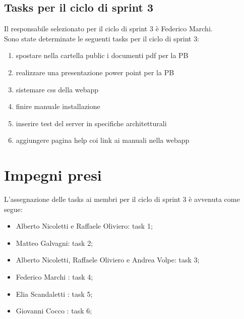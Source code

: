 \documentclass[a4paper, 12pt]{article}
\begin{document}
\subsection{Tasks per il ciclo di sprint 3}
Il responsabile selezionato per il ciclo di sprint 3 è Federico Marchi. \\
Sono state determinate le seguenti tasks per il ciclo di sprint 3:
\begin{enumerate}
	\item spostare nella cartella public i documenti pdf per la PB
	\item realizzare una presentazione power point per la PB
	\item sistemare css della webapp
	\item finire manuale installazione
	\item inserire test del server in specifiche architetturali
	\item aggiungere pagina help coi link ai manuali nella webapp
\end{enumerate}

\section{Impegni presi}
L'assegnazione delle tasks ai membri per il ciclo di sprint 3 è avvenuta come segue:
\begin{itemize}
	\item Alberto Nicoletti e Raffaele Oliviero: task 1;
	\item Matteo Galvagni: task 2;
	\item Alberto Nicoletti, Raffaele Oliviero e Andrea Volpe: task 3;
	\item Federico Marchi : task 4;
	\item Elia Scandaletti : task 5;
	\item Giovanni Cocco : task 6;
\end{itemize}
\end{document}
